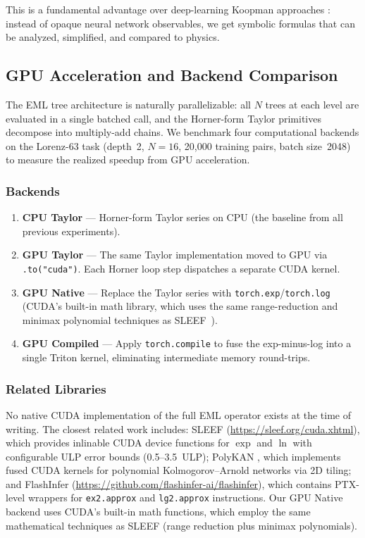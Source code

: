 \documentclass[11pt]{article}
\begin{document}
\noindent
This is a fundamental advantage over deep-learning Koopman approaches
\citep[e.g., LRAN,][]{otto2019,lusch2018}: instead of opaque neural network
observables, we get symbolic formulas that can be analyzed, simplified, and
compared to physics.


\subsection{GPU Acceleration and Backend Comparison}
\label{sec:cuda}

The EML tree architecture is naturally parallelizable: all $N$ trees at
each level are evaluated in a single batched call, and the Horner-form
Taylor primitives decompose into multiply-add chains.  We benchmark
four computational backends on the Lorenz-63 task (depth~2, $N\!=\!16$,
20{,}000 training pairs, batch size~2048) to measure the realized
speedup from GPU acceleration.

\subsubsection{Backends}

\begin{enumerate}
  \item \textbf{CPU Taylor} --- Horner-form Taylor series on CPU (the
    baseline from all previous experiments).
  \item \textbf{GPU Taylor} --- The same Taylor implementation moved to
    GPU via \texttt{.to("cuda")}.  Each Horner loop step dispatches a
    separate CUDA kernel.
  \item \textbf{GPU Native} --- Replace the Taylor series with
    \texttt{torch.exp}/\texttt{torch.log} (CUDA's built-in math library,
    which uses the same range-reduction and minimax polynomial techniques
    as SLEEF~\citep{sleef}).
  \item \textbf{GPU Compiled} --- Apply \texttt{torch.compile} to fuse
    the exp-minus-log into a single Triton kernel, eliminating intermediate
    memory round-trips.
\end{enumerate}

\subsubsection{Related Libraries}

No native CUDA implementation of the full EML operator exists at the time
of writing.  The closest related work includes:
SLEEF (\url{https://sleef.org/cuda.xhtml}), which provides inlinable CUDA
device functions for $\exp$ and $\ln$ with configurable ULP error bounds
(0.5--3.5~ULP);
PolyKAN \citep{polykan2025}, which implements fused CUDA kernels for
polynomial Kolmogorov--Arnold networks via 2D tiling;
and FlashInfer (\url{https://github.com/flashinfer-ai/flashinfer}), which
contains PTX-level wrappers for \texttt{ex2.approx} and \texttt{lg2.approx}
instructions.  Our GPU Native backend uses CUDA's built-in math functions,
which employ the same mathematical techniques as SLEEF (range reduction
plus minimax polynomials).
\end{document}
